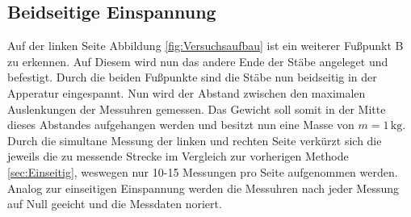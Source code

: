 \subsection{Beidseitige Einspannung}

Auf der linken Seite Abbildung \ref{fig:Versuchsaufbau} ist ein weiterer Fußpunkt B zu erkennen. Auf Diesem wird nun das
andere Ende der Stäbe angeleget und befestigt. Durch die beiden Fußpunkte sind die Stäbe nun beidseitig in der Apperatur
eingespannt. Nun wird der Abstand zwischen den maximalen Auslenkungen der Messuhren gemessen. Das Gewicht soll somit in der
Mitte dieses Abstandes aufgehangen werden und besitzt nun eine Masse von $m = 1\,\unit{\kilo\gram}$. Durch die simultane Messung der linken und rechten Seite verkürzt sich die jeweils
die zu messende Strecke im Vergleich zur vorherigen Methode \ref{sec:Einseitig}, weswegen nur 10-15 Messungen pro Seite 
aufgenommen werden. Analog zur einseitigen Einspannung werden die Messuhren nach jeder Messung auf Null geeicht und die Messdaten noriert.



